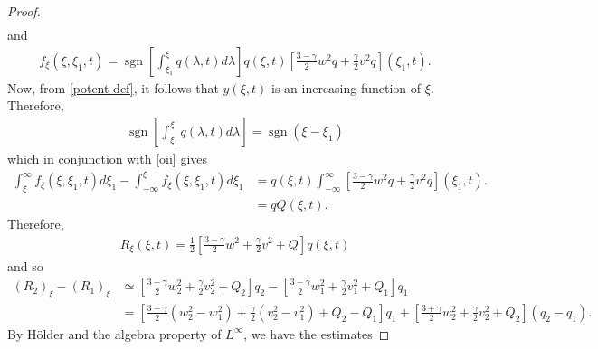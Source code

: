 \documentclass[12pt,reqno]{amsart}
\numberwithin{equation}{section}  %
\numberwithin{figure}{section}
\DeclareMathOperator{\sgn}{sgn}
\begin{document}
\begin{proof}
\begin{gather*}
\end{gather*}
and
%
%
\begin{equation}
\label{oii}
\begin{split}
f_{\xi}(\xi, \xi_{1}, t) = \sgn \left [ \int_{\xi_{1}}^{\xi} q(\lambda, t) d \lambda \right ]q(\xi, t) \left [ \frac{3- \gamma}{2} w^{2} q + \frac{\gamma}{2} v^{2}q \right ] (\xi_{1}, t).
\end{split}
\end{equation}
%
%
Now, from \eqref{potent-def}, it follows that $y(\xi, t)$ is an increasing function of $\xi$. Therefore, 
%
%
\begin{equation*}
\begin{split}
\sgn \left [ \int_{\xi_1}^{\xi} q(\lambda, t) d \lambda \right ]  = \sgn(\xi - \xi_1)
\end{split}
\end{equation*}
%
%
which in conjunction with \eqref{oii} gives
%
%
\begin{equation*}
\begin{split}
\int_{\xi}^{\infty} f_{\xi}(\xi, \xi_{1}, t) d \xi_{1} - \int_{-\infty}^{\xi} f_{\xi}(\xi, \xi_{1}, t) d \xi_{1}
& = q(\xi, t) \int_{-\infty}^{\infty} \left [ \frac{3- \gamma}{2} w^{2} q + \frac{\gamma}{2} v^{2}q \right ] (\xi_{1}, t).
\\
& = q Q(\xi, t).
\end{split}
\end{equation*}
%
%
Therefore,
%
%
\begin{equation*}
\begin{split}
R_{\xi}(\xi, t) = \frac{1}{2} \left [ \frac{3- \gamma}{2} w^{2} + \frac{\gamma}{2} v^{2} + Q \right ]q(\xi, t)
\end{split}
\end{equation*}
%
and so
%
%
\begin{equation*}
\begin{split}
  (R_{2})_{\xi} - (R_{1})_{\xi} 
  & \simeq \left[ \frac{3 - \gamma}{2} w_{2}^{2} +
  \frac{\gamma}{2}v_{2}^{2} + Q_{2}  \right]q_{2} - \left[ \frac{3 - \gamma}{2}
  w_{1}^{2} + \frac{\gamma}{2}v_{1}^{2} + Q_{1}  \right]q_{1}  
  \\
  & = \left[ \frac{3 - \gamma}{2} (w_{2}^{2} - w_{1}^{2}) +
  \frac{\gamma}{2}(v_{2}^{2} - v_{1}^{2}) + Q_{2} - Q_{1}  \right]q_{1} + \left[
  \frac{3 + \gamma}{2} w_{2}^{2} + \frac{\gamma}{2}v_{2}^{2} + Q_{2}
  \right](q_{2} - q_{1}).  
\end{split}
\end{equation*}
%
By H\"older and the algebra property of $L^{\infty}$, we have the estimates

\end{proof}
\end{document}
